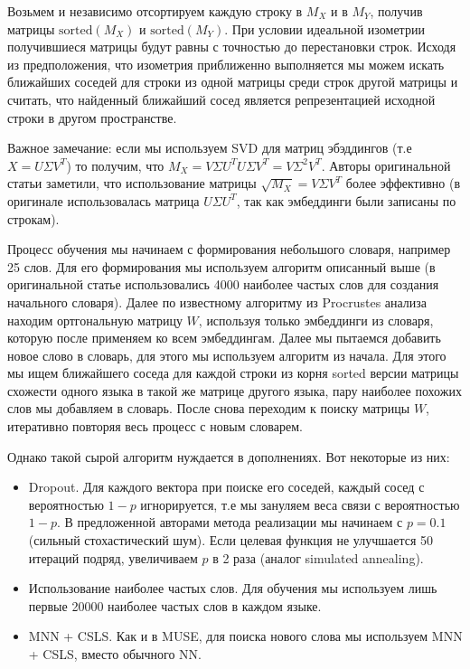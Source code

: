\documentclass{article}
\begin{document}
    Возьмем и независимо отсортируем каждую строку в $M_{X}$ и в $M_{Y}$, получив матрицы $\text{sorted}(M_{X})$
    и $\text{sorted}(M_{Y})$. 
    При условии идеальной изометрии получившиеся матрицы 
    будут равны с точностью до перестановки строк. Исходя из предположения, что изометрия приближенно выполняется
    мы можем искать ближайших соседей для строки из одной матрицы среди строк другой матрицы и считать, что найденный ближайший сосед 
    является репрезентацией исходной строки в другом пространстве. 

    Важное замечание: если мы используем SVD для матриц эбэддингов (т.е $X = U \Sigma V^{T}$) 
    то получим, что $M_{X} = V \Sigma U^{T}  U \Sigma V^{T} = V \Sigma^{2} V^{T}$. Авторы оригинальной 
    статьи заметили, что использование матрицы $\sqrt{M_{X}} = V \Sigma V^{T}$ более эффективно 
    (в оригинале использовалась матрица $U \Sigma U^{T}$, так как эмбеддинги были записаны по строкам).

    Процесс обучения мы начинаем с формирования небольшого словаря, например 25 слов. Для его формирования мы используем алгоритм описанный выше 
    (в оригинальной статье использовались 4000 наиболее частых слов для создания начального словаря). 
    Далее по известному алгоритму из Procrustes анализа находим 
    ортгональную матрицу $W$, используя только эмбеддинги из словаря, которую после применяем ко всем эмбеддингам. 
    Далее мы пытаемся добавить новое слово 
    в словарь, для этого мы используем алгоритм из начала. 
    Для этого мы ищем ближайшего соседа для каждой строки из корня sorted версии матрицы схожести 
    одного языка в такой же матрице другого языка, пару наиболее похожих слов мы добавляем в словарь. 
    После снова переходим к поиску матрицы $W$, итеративно повторяя весь процесс с новым словарем.

    Однако такой сырой алгоритм нуждается в дополнениях. Вот некоторые из них: 

    \begin{itemize}
        \item Dropout. Для каждого вектора при поиске его соседей, каждый сосед с вероятностью 
        $1 - p$ игнорируется, т.е мы зануляем веса связи с вероятностью $1 - p$. В предложенной авторами метода
        реализации мы начинаем с $p = 0.1$ (сильный стохастический шум). Если целевая функция не улучшается 50 итераций подряд, 
        увеличиваем $p$ в 2 раза (аналог simulated annealing). 
        \item Использование наиболее частых слов. Для обучения мы используем лишь первые 
        20000 наиболее частых слов в каждом языке.
        \item MNN + CSLS. Как и в MUSE, для поиска нового слова мы используем MNN + CSLS, вместо обычного NN.
    \end{itemize}
\end{document}
